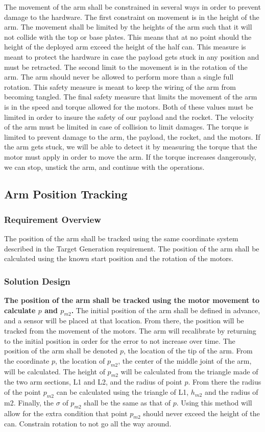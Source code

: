 \documentclass[letterpaper,10pt]{article}
\begin{document}
The movement of the arm shall be constrained in several ways in order to prevent damage to the hardware. 
The first constraint on movement is in the height of the arm. The movement shall be limited by the 
heights of the arm such that it will not collide with the top or base plates. This means that at no 
point should the height of the deployed arm exceed the height of the half can. This measure is meant to 
protect the hardware in case the payload gets stuck in any position and must be retracted. The second 
limit to the movement is in the rotation of the arm. The arm should never be allowed to perform more 
than a single full rotation. This safety measure is meant to keep the wiring of the arm from becoming 
tangled. The final safety measure that limits the movement of the arm is in the speed and torque allowed 
for the motors. Both of these values must be limited in order to insure the safety of our payload and 
the rocket. The velocity of the arm must be limited in case of collision to limit damages. The torque is 
limited to prevent damage to the arm, the payload, the rocket, and the motors. If the arm gets stuck, we 
will be able to detect it by measuring the torque that the motor must apply in order to move the arm. If 
the torque increases dangerously, we can stop, unstick the arm, and continue with the operations.

\subsection{Arm Position Tracking}
\subsubsection{Requirement Overview}
The position of the arm shall be tracked using the same coordinate system described in the Target Generation requirement.
The position of the arm shall be calculated using the known start position and the rotation of the motors.
\subsubsection{Solution Design}
\textbf{The position of the arm shall be tracked using the motor movement to calculate \(p\) and 
\(p_{m2}\).}
The initial position of the arm shall be defined in advance, and a sensor will be placed at that location. 
From there, the position will be tracked from the movement of the motors.
The arm will recalibrate by returning to the initial position in order for the error to not increase over
 time.
The position of the arm shall be denoted \(p\), the location of the tip of the arm.
From the coordinate \(p\), the location of \(p_{m2}\), the center of the middle joint of the arm, will be
 calculated. The height of \(p_{m2}\) will be calculated from the triangle made of the two arm sections, 
L1 and L2, and the radius of point \(p\). From there the radius of the point \(p_{m2}\) can be calculated
 using the triangle of L1, \(h_{m2}\) and the radius of m2. Finally, the \(\sigma\) of \(p_{m2}\) shall 
be the same as that of \(p\).
Using this method will allow for the extra condition that point \(p_{m2}\) should never exceed the height
 of the can.
Constrain rotation to not go all the way around.
\end{document}
